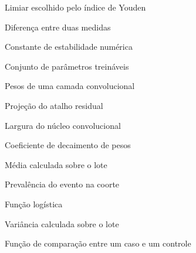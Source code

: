 \begin{simbolos}
	\item[$ \delta^{*} $] Limiar escolhido pelo índice de Youden
	\item[$ \Delta $] Diferença entre duas medidas
	\item[$ \epsilon $] Constante de estabilidade numérica
	\item[$ \theta $] Conjunto de parâmetros treináveis
	\item[$ \boldsymbol{\Theta} $] Pesos de uma camada convolucional
	\item[$ \boldsymbol{\Theta}_s $] Projeção do atalho residual
	\item[$ \kappa $] Largura do núcleo convolucional
	\item[$ \lambda $] Coeficiente de decaimento de pesos
	\item[$ \mu_{\mathcal{B}} $] Média calculada sobre o lote
	\item[$ \pi $] Prevalência do evento na coorte
	\item[$ \sigma(\cdot) $] Função logística
	\item[$ \sigma^{2}_{\mathcal{B}} $] Variância calculada sobre o lote
	\item[$ \varphi $] Função de comparação entre um caso e um controle
\end{simbolos}